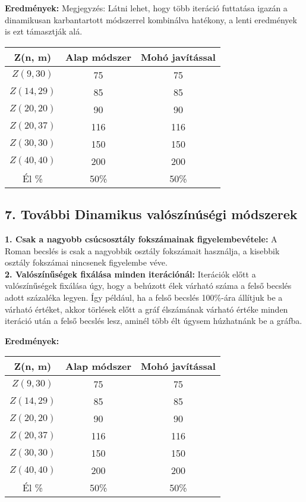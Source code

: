 \documentclass[12pt,a4paper]{article}
\begin{document}
\textbf{Eredmények:}
Megjegyzés: Látni lehet, hogy több iteráció futtatása igazán a dinamikusan karbantartott módszerrel kombinálva hatékony, a lenti eredmények is ezt támasztják alá.
\begin{table}[H]
\centering
\begin{tabular}{|c|c|c|}
\hline
\textbf{Z(n, m)} & \textbf{Alap módszer} & \textbf{Mohó javítással} \\
\hline
$Z(9,30)$  & 75 & 75 \\
$Z(14, 29)$ & 85 & 85 \\
$Z(20, 20)$ & 90 & 90 \\
$Z(20, 37)$ & 116 & 116 \\
$Z(30, 30)$ & 150 & 150 \\
$Z(40, 40)$ & 200 & 200 \\
\hline
Él \% & 50\% & 50\% \\
\hline
\end{tabular}
\end{table}

\subsection*{7. További Dinamikus valószínúségi módszerek}

\textbf{1. Csak a nagyobb csúcsosztály fokszámainak figyelembevétele:} A Roman becslés is csak a nagyobbik osztály fokszámait használja, a kisebbik osztály fokszámai nincsenek figyelembe véve.\\
\textbf{2. Valószínűségek fixálása minden iterációnál:} Iterációk előtt a valószínűségek fixálása úgy, hogy a behúzott élek várható száma a felső becslés adott százaléka legyen. Így például, ha a felső becslés 100\%-ára állítjuk be a várható értéket, akkor törlések előtt a gráf élszámának várható értéke minden iteráció után a felső becslés lesz, aminél több élt úgysem húzhatnánk be a gráfba.

\textbf{Eredmények:}
\begin{table}[H]
\centering
\begin{tabular}{|c|c|c|}
\hline
\textbf{Z(n, m)} & \textbf{Alap módszer} & \textbf{Mohó javítással} \\
\hline
$Z(9,30)$  & 75 & 75 \\
$Z(14, 29)$ & 85 & 85 \\
$Z(20, 20)$ & 90 & 90 \\
$Z(20, 37)$ & 116 & 116 \\
$Z(30, 30)$ & 150 & 150 \\
$Z(40, 40)$ & 200 & 200 \\
\hline
Él \% & 50\% & 50\% \\
\hline
\end{tabular}
\end{table}
\end{document}
